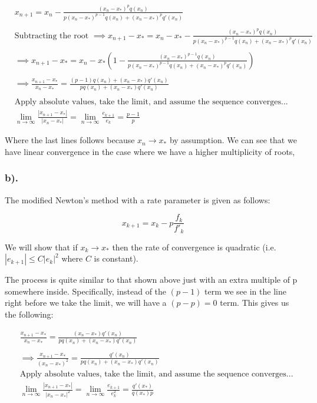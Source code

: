 \documentclass[11pt]{article}
\begin{document}
\begin{align}
    &x_{n+1} = x_n - \frac{(x_n-x_*)^pq(x_n)}{p(x_n-x_*)^{p-1}q(x_n) + (x_n-x_*)^pq'(x_n)}\\
    &~\\
    &\text{Subtracting the root }\implies x_{n+1}-x_* = x_n-x_* - \frac{(x_n-x_*)^pq(x_n)}{p(x_n-x_*)^{p-1}q(x_n) + (x_n-x_*)^pq'(x_n)}\\
    &~\\
    &\implies x_{n+1}-x_* = x_n-x_*(1-\frac{(x_n-x_*)^{p-1}q(x_n)}{p(x_n-x_*)^{p-1}q(x_n) + (x_n-x_*)^pq'(x_n)})\\
    &~\\
    &\implies \frac{x_{n+1}-x_*}{x_n-x_*} = \frac{(p-1)q(x_n)+(x_n-x_*)q'(x_n)}{pq(x_n)+(x_n-x_*)q'(x_n)}\\
    &~\\
    &\text{Apply absolute values, take the limit, and assume the sequence converges...}\\
    &\lim_{n\to\infty} \frac{|x_{n+1}-x_*|}{|x_n-x_*|} = \boxed{\lim_{n\to\infty} \frac{e_{k+1}}{e_k} = \frac{p-1}{p}}
\end{align}

Where the last lines follows because \(x_n\to x_*\) by assumption. We
can see that we have linear convergence in the case where we have a
higher multiplicity of roots,

    \hypertarget{b.}{%
\subsubsection*{b).}\label{b.}}

The modified Newton's method with a rate parameter is given as follows:

\[ x_{k+1} = x_k - p\frac{f_k}{f'_k} \]

We will show that if \(x_k\to x_*\) then the rate of convergence is
quadratic (i.e. \(|e_{k+1}|\leq C|e_k|^2\) where \(C\) is constant).

    The process is quite similar to that shown above just with an extra
multiple of p somewhere inside. Specifically, instead of the \((p-1)\)
term we see in the line right before we take the limit, we will have a
\((p-p)=0\) term. This gives us the following:

\begin{align}
    &\frac{x_{n+1}-x_*}{x_n-x_*} = \frac{(x_n-x_*)q'(x_n)}{pq(x_n)+(x_n-x_*)q'(x_n)}\\
    &~\\
    &\implies \frac{x_{n+1}-x_*}{(x_n-x_*)^2} = \frac{q'(x_n)}{pq(x_n)+(x_n-x_*)q'(x_n)}\\
    &\text{Apply absolute values, take the limit, and assume the sequence converges...}\\
    &\lim_{n\to\infty} \frac{|x_{n+1}-x_*|}{|x_n-x_*|^2} = \boxed{\lim_{n\to\infty} \frac{e_{k+1}}{e_k^2} = \frac{q'(x_*)}{q(x_*)p}}
\end{align}
\end{document}
